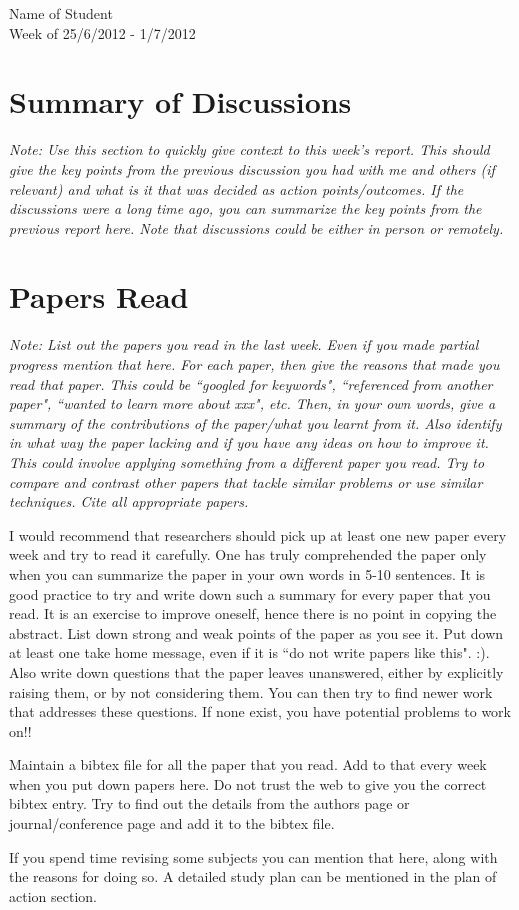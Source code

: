 \documentclass{article}[11pt]
\begin{document}
\begin{center}
Name of Student\\
Week of 25/6/2012 - 1/7/2012
\end{center}
\section{Summary of Discussions}
{\it Note: Use this section to quickly give context to this week's report.
This should give the key points from the previous discussion you had with me
and others (if relevant) and what is it that was decided as action
points/outcomes. If the discussions were a long time ago, you can summarize
the key points from the previous report here. Note that discussions could be
either in person or remotely.}

\section{Papers Read}
{\it Note: List out the papers you read in the last week. Even if you made
partial progress mention that here. For each paper, then give the reasons
that made you read that paper. This could be ``googled for keywords",
``referenced from another paper", ``wanted to learn more about xxx", etc.
Then, in your own words, give a summary of the contributions of the
paper/what you learnt from it. Also identify in what way the paper lacking
and if you have any ideas on how to improve it. This could involve applying
something from a different paper you read. Try to compare and contrast
other papers that tackle similar problems or use similar techniques. Cite
all appropriate papers.

I would recommend that researchers should pick up at least one new paper
every week and try to read it carefully. One has truly comprehended the
paper only when you can summarize the paper in your own words in 5-10
sentences. It is good practice to try and write down such a summary for
every paper that you read. It is an exercise to improve oneself, hence there
is no point in copying the abstract. List down strong and weak points of the
paper as you see it. Put down at least one take home message, even if it is
``do not write papers like this". :). Also write down questions that the
paper leaves unanswered, either by explicitly raising them, or by not
considering them. You can then try to find newer work that addresses these
questions. If none exist, you have potential problems to work on!! 

Maintain a bibtex file for all the paper that you read. Add to that every
week when you put down papers here. Do not trust the web to give you the
correct bibtex entry. Try to find out the details from the authors page or
journal/conference page and add it to the bibtex file. 

If you spend time revising some subjects you can mention that here, along
with the reasons for doing so. A detailed study plan can be mentioned in the
plan of action section.
}
\end{document}
